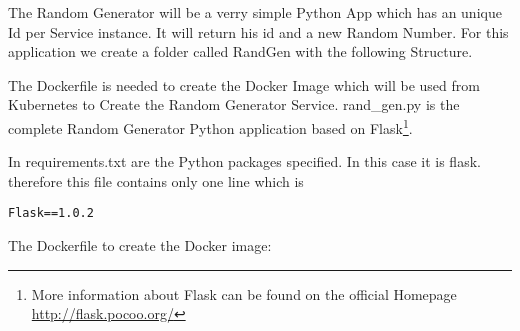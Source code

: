 The Random Generator will be a verry simple Python App which has an unique Id per Service instance. It will return his id and a new Random Number. For this application we create a folder called RandGen with the following Structure.

The Dockerfile is needed to create the Docker Image which will be used from Kubernetes to Create the Random Generator Service.
rand\_gen.py is the complete Random Generator Python application based on Flask\footnote{More information about Flask can be found on the official Homepage \url{http://flask.pocoo.org/}}.
 
In requirements.txt are the Python packages specified. In this case it is flask. therefore this file contains only one line which is
\begin{verbatim}
Flask==1.0.2
\end{verbatim}

The Dockerfile to create the Docker image:

